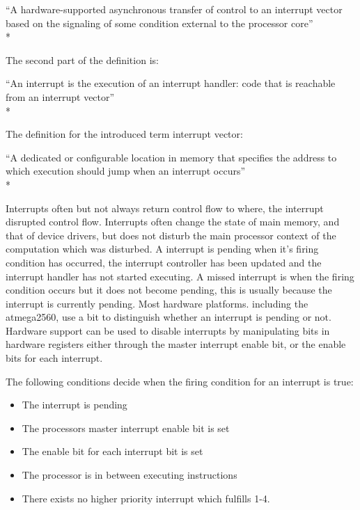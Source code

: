{\addtolength{\leftskip}{10 mm}
	\enquote{A hardware-supported asynchronous transfer of control to an interrupt vector based on the signaling of some condition external to the processor core}\\*
	
}

The second part of the definition is:

{\addtolength{\leftskip}{10 mm}
	\enquote{An interrupt is the execution of an interrupt handler: code that is reachable from an interrupt vector}\\*
	
}

The definition for the introduced term interrupt vector:

{\addtolength{\leftskip}{10 mm}
	\enquote{A dedicated or configurable location in memory that specifies the address to which execution should jump when an interrupt occurs}\\*
	
}

Interrupts often but not always return control flow to where, the interrupt disrupted control flow. Interrupts often change the state of main memory, and that of device drivers, but does not disturb the main processor context of the computation which was disturbed.\newline
A interrupt is pending when it's firing condition has occurred, the interrupt controller has been updated and the interrupt handler has not started executing. A missed interrupt is when the firing condition occurs but it does not become pending, this is usually because the interrupt is currently pending. Most hardware platforms. including the atmega2560, use a bit to distinguish whether an interrupt is pending or not. Hardware support can be used to disable interrupts by manipulating bits in hardware registers either through the master interrupt enable bit, or the enable bits for each interrupt. 

The following conditions decide when the firing condition for an interrupt is true:

\begin{itemize}
	\item The interrupt is pending
	\item The processors master interrupt enable bit is set
	\item The enable bit for each interrupt bit is set
	\item The processor is in between executing instructions
	\item There exists no higher priority interrupt which fulfills 1-4.
\end{itemize}

